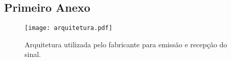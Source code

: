 \begin{anexosenv}

\partanexos
\chapter{Primeiro Anexo}

\begin{figure}[H]
    \centering
   \texttt{[image: arquitetura.pdf]}
  \caption{Arquitetura utilizada pelo fabricante para emissão e recepção do sinal.}
   \label{arquitetura1}
    \end{figure}
	

\end{anexosenv}

